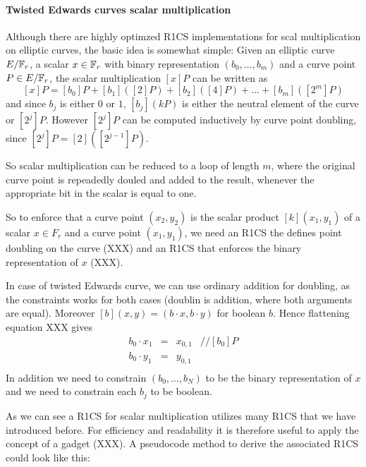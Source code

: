\paragraph{Twisted Edwards curves scalar multiplication} 

Although there are highly optimzed R1CS implementations for scal multiplication on elliptic curves, the basic idea is somewhat simple: Given an elliptic curve $E/\mathbb{F}_r$, a scalar $x\in \mathbb{F}_r$ with binary representation $(b_0,\ldots,b_m)$ and a curve point $P\in E/\mathbb{F}_r$, the scalar multiplication $[x]P$ can be written as
$$
[x]P = [b_0]P + [b_1]([2]P) + [b_2]([4]P) + \ldots + [b_m]([2^m] P)
$$
and since $b_j$ is either $0$ or $1$, $[b_j](kP)$ is either the neutral element of the curve or $[2^j]P$. However $[2^j]P$ can be computed inductively by curve point doubling, since $[2^j]P= [2]([2^{j-1}]P)$.

So scalar multiplication can be reduced to a loop of length $m$, where the original curve point is repeadedly douled and added to the result, whenever the appropriate bit in the scalar is equal to one.

So to enforce that a curve point $(x_2,y_2)$ is the scalar product $[k](x_1,y_1)$ of a scalar $x\in F_r$ and a curve point $(x_1,y_1)$, we need an R1CS the defines point doubling on the curve (XXX) and an R1CS that enforces the binary representation of $x$ (XXX). 

In case of twisted Edwards curve, we can use ordinary addition for doubling, as the constraints works for both cases (doublin is addition, where both arguments are equal). Moreover $[b](x,y)=(b\cdot x, b\cdot y)$ for boolean $b$. Hence flattening equation XXX gives
$$
\begin{array}{lclr}
b_0\cdot x_1 &=& x_{0,1} & // [b_0]P\\
b_0\cdot y_1 &=& y_{0,1}\\

\end{array}
$$
In addition we need to constrain $(b_0,\ldots, b_N)$ to be the binary representation of $x$ and we need to constrain each $b_j$ to be boolean.

As we can see a R1CS for scalar multiplication utilizes many R1CS that we have introduced before. For efficiency and readability it is therefore useful to apply the concept of a gadget (XXX). A pseudocode method to derive the associated R1CS could look like this:


